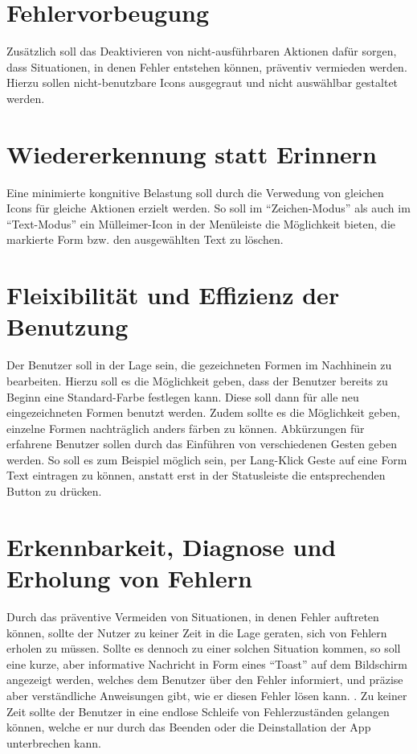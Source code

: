 \section{Fehlervorbeugung}
Zusätzlich soll das Deaktivieren von nicht-ausführbaren Aktionen dafür sorgen, dass Situationen, in denen Fehler entstehen können, präventiv vermieden werden.
Hierzu sollen nicht-benutzbare Icons ausgegraut und nicht auswählbar gestaltet werden.

\section{Wiedererkennung statt Erinnern}
Eine minimierte kongnitive Belastung soll durch die Verwedung von gleichen Icons für gleiche Aktionen erzielt werden.
So soll im ``Zeichen-Modus'' als auch im ``Text-Modus'' ein Mülleimer-Icon in der Menüleiste die Möglichkeit bieten, die markierte Form bzw. den ausgewählten Text zu löschen.

\section{Fleixibilität und Effizienz der Benutzung}
Der Benutzer soll in der Lage sein, die gezeichneten Formen im Nachhinein zu bearbeiten.
Hierzu soll es die Möglichkeit geben, dass der Benutzer bereits zu Beginn eine Standard-Farbe festlegen kann.
Diese soll dann für alle neu eingezeichneten Formen benutzt werden.
Zudem sollte es die Möglichkeit geben, einzelne Formen nachträglich anders färben zu können.
Abkürzungen für erfahrene Benutzer sollen durch das Einführen von verschiedenen Gesten geben werden.
So soll es zum Beispiel möglich sein, per Lang-Klick Geste auf eine Form Text eintragen zu können, anstatt erst in der Statusleiste die entsprechenden Button zu drücken.

\section{Erkennbarkeit, Diagnose und Erholung von Fehlern}
Durch das präventive Vermeiden von Situationen, in denen Fehler auftreten können, sollte der Nutzer zu keiner Zeit in die Lage geraten, sich von Fehlern erholen zu müssen.
Sollte es dennoch zu einer solchen Situation kommen, so soll eine kurze, aber informative Nachricht in Form eines ``Toast'' auf dem Bildschirm angezeigt werden, welches dem Benutzer über den Fehler informiert, und präzise aber verständliche Anweisungen gibt, wie er diesen Fehler lösen kann. .
Zu keiner Zeit sollte der Benutzer in eine endlose Schleife von Fehlerzuständen gelangen können, welche er nur durch das Beenden oder die Deinstallation der App unterbrechen kann.

